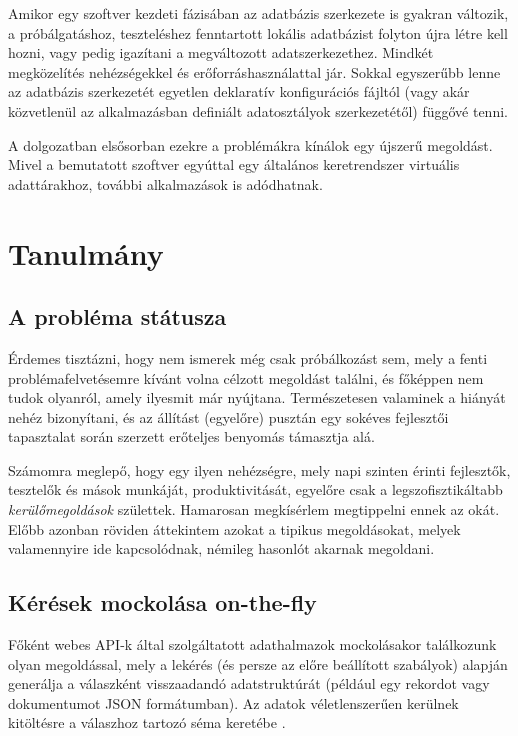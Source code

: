 \documentclass[
    parspace,
    noindent,
    nohyp,
]{elteiktdk}[2023/04/10]
\begin{document}
Amikor egy szoftver kezdeti fázisában az adatbázis szerkezete is gyakran változik,
a próbálgatáshoz, teszteléshez fenntartott lokális adatbázist folyton újra létre kell hozni,
vagy pedig igazítani a megváltozott adatszerkezethez.
Mindkét megközelítés nehézségekkel és erőforráshasználattal jár.
Sokkal egyszerűbb lenne az adatbázis szerkezetét egyetlen deklaratív konfigurációs fájltól
(vagy akár közvetlenül az alkalmazásban definiált adatosztályok szerkezetétől) függővé tenni.

A dolgozatban elsősorban ezekre a problémákra kínálok egy újszerű megoldást.
Mivel a bemutatott szoftver egyúttal egy általános keretrendszer virtuális adattárakhoz,
további alkalmazások is adódhatnak.

\section{Tanulmány}

\subsection{A probléma státusza}

Érdemes tisztázni, hogy nem ismerek még csak próbálkozást sem,
mely a fenti problémafelvetésemre kívánt volna célzott megoldást találni,
és főképpen nem tudok olyanról, amely ilyesmit már nyújtana.
Természetesen valaminek a hiányát nehéz bizonyítani,
és az állítást (egyelőre) pusztán egy sokéves fejlesztői tapasztalat
során szerzett erőteljes benyomás támasztja alá.

Számomra meglepő, hogy egy ilyen nehézségre,
mely napi szinten érinti fejlesztők, tesztelők és mások munkáját, produktivitását,
egyelőre csak a legszofisztikáltabb \textit{kerülőmegoldások} születtek.
Hamarosan megkísérlem megtippelni ennek az okát.
Előbb azonban röviden áttekintem azokat a tipikus megoldásokat,
melyek valamennyire ide kapcsolódnak, némileg hasonlót akarnak megoldani.

\subsection{Kérések mockolása on-the-fly}

Főként webes API-k által szolgáltatott adathalmazok mockolásakor találkozunk olyan megoldással,
mely a lekérés (és persze az előre beállított szabályok)
alapján generálja a válaszként visszaadandó adatstruktúrát
(például egy rekordot vagy dokumentumot JSON formátumban).
Az adatok véletlenszerűen kerülnek kitöltésre a válaszhoz tartozó séma keretébe%
\cite{Golmohammadi2023TestingRestful,Samimi2013DeclarativeMocking,SoftwarePostman,SoftwareWireMock,SoftwareStoplight,SoftwareSoapUi}.
\end{document}
